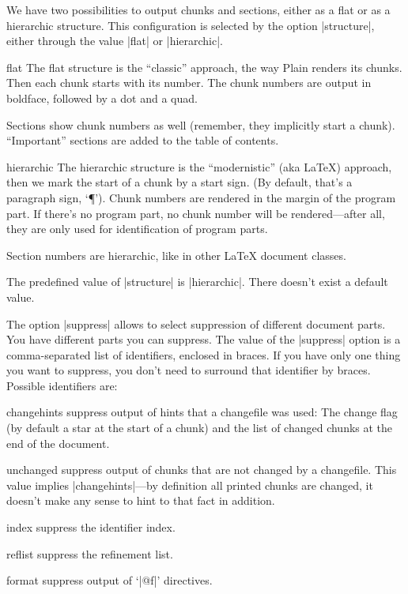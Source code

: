 We have two possibilities to output chunks and sections, either
as a flat or as a hierarchic structure. This configuration is selected
by the option |structure|, either through the value |flat| or
|hierarchic|.
%
\begin{options}

\item[flat] The flat structure is the ``classic'' approach,
  the way Plain \cweb{} renders its chunks. Then each chunk starts
  with its number. The chunk numbers are output in boldface, followed
  by a dot and a quad.

  Sections show chunk numbers as well (remember, they implicitly
  start a chunk). ``Important'' sections are added to the table of
  contents.

\item[hierarchic] The hierarchic structure is the
  ``modernistic'' (aka \LaTeX{}) approach, then we mark the start of a
  chunk by a start sign. (By default, that's a paragraph sign, `\P').
  Chunk numbers are rendered in the margin of the program part. If
  there's no program part, no chunk number will be rendered---after
  all, they are only used for identification of program parts.

  Section numbers are hierarchic, like in other \LaTeX{} document
  classes.

\end{options}
%
The predefined value of |structure| is |hierarchic|. There doesn't
exist a default value.


\sect The option |suppress| allows to select suppression of different
document parts. You have different parts you can suppress. The value
of the |suppress| option is a comma-separated list of identifiers,
enclosed in braces. If you have only one thing you want to suppress,
you don't need to surround that identifier by braces. Possible
identifiers are:

\begin{options}

\item[changehints] suppress output of hints that a changefile was
  used: The change flag (by default a star at the start of a chunk)
  and the list of changed chunks at the end of the document.

\item[unchanged] suppress output of chunks that are not changed by
  a changefile. This value implies |changehints|---by definition all
  printed chunks are changed, it doesn't make any sense to hint to
  that fact in addition.

\item[index] suppress the identifier index.

\item[reflist] suppress the refinement list.

\item[format] suppress output of `|@f|' directives.

\end{options}

